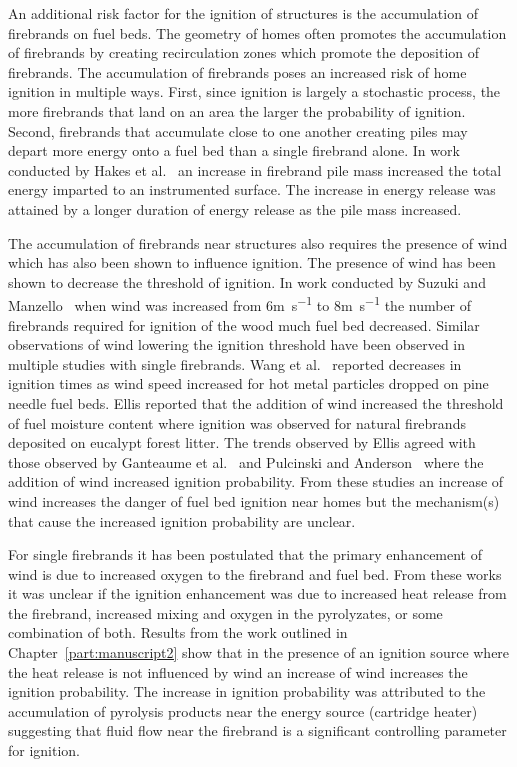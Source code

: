     An additional risk factor for the ignition of structures is the accumulation of firebrands on fuel beds. The geometry of homes often promotes the accumulation of firebrands by creating recirculation zones which promote the deposition of firebrands. The accumulation of firebrands poses an increased risk of home ignition in multiple ways. First, since ignition is largely a stochastic process, the more firebrands that land on an area the larger the probability of ignition. Second, firebrands that accumulate close to one another creating piles may depart more energy onto a fuel bed than a single firebrand alone. In work conducted by Hakes et al.~\cite{Hakes2019a} an increase in firebrand pile mass increased the total energy imparted to an instrumented surface. The increase in energy release was attained by a longer duration of energy release as the pile mass increased.
    
    The accumulation of firebrands near structures also requires the presence of wind which has also been shown to influence ignition. The presence of wind has been shown to decrease the threshold of ignition. In work conducted by Suzuki and Manzello~\cite{Suzuki2020a} when wind was increased from 6\si{\meter\per\second} to 8\si{\meter\per\second} the number of firebrands required for ignition of the wood much fuel bed decreased. Similar observations of wind lowering the ignition threshold have been observed in multiple studies with single firebrands. Wang et al.~\cite{Wang2017} reported decreases in ignition times as wind speed increased for hot metal particles dropped on pine needle fuel beds. Ellis reported that the addition of wind increased the threshold of fuel moisture content where ignition was observed for natural firebrands  deposited on eucalypt forest litter. The trends observed by Ellis agreed with those observed by Ganteaume et al.~\cite{Ganteaume2009} and Pulcinski and Anderson~\cite{Plucinski2008} where the addition of wind increased ignition probability. From these studies an increase of wind increases the danger of fuel bed ignition near homes but the mechanism(s) that cause the increased ignition probability are unclear. 
    
    For single firebrands it has been postulated that the primary enhancement of wind is due to increased oxygen to the firebrand and fuel bed. From these works it was unclear if the ignition enhancement was due to increased heat release from the firebrand, increased mixing and oxygen in the pyrolyzates, or some combination of both. Results from the work outlined in Chapter~\ref{part:manuscript2} show that in the presence of an ignition source where the heat release is not influenced by wind an increase of wind increases the ignition probability. The increase in ignition probability was attributed to the accumulation of pyrolysis products near the energy source (cartridge heater) suggesting that fluid flow near the firebrand is a significant controlling parameter for ignition. 
    
